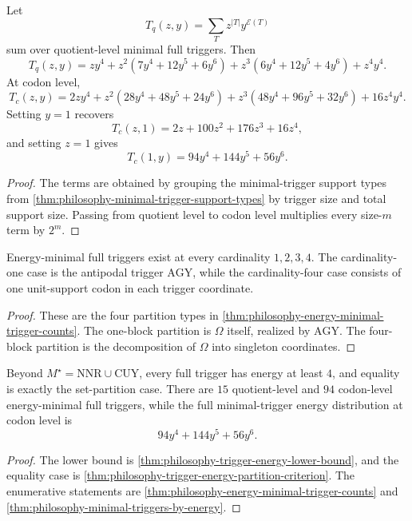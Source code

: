 \begin{theorem}
\label{thm:philosophy-bivariate-minimal-trigger-polynomial}
Let
$$
  T_{q}(z,y)=\sum_{T}z^{|T|}y^{\mathcal{E}(T)}
$$
sum over quotient-level minimal full triggers. Then
$$
  T_{q}(z,y)
  =
  zy^{4}
  +
  z^{2}(7y^{4}+12y^{5}+6y^{6})
  +
  z^{3}(6y^{4}+12y^{5}+4y^{6})
  +
  z^{4}y^{4}.
$$
At codon level,
$$
  T_{c}(z,y)
  =
  2zy^{4}
  +
  z^{2}(28y^{4}+48y^{5}+24y^{6})
  +
  z^{3}(48y^{4}+96y^{5}+32y^{6})
  +
  16z^{4}y^{4}.
$$
Setting $y=1$ recovers
$$
  T_{c}(z,1)=2z+100z^{2}+176z^{3}+16z^{4},
$$
and setting $z=1$ gives
$$
  T_{c}(1,y)=94y^{4}+144y^{5}+56y^{6}.
$$
\end{theorem}
\begin{proof}
The terms are obtained by grouping the minimal-trigger support types
from \autoref{thm:philosophy-minimal-trigger-support-types} by trigger
size and total support size. Passing from quotient level to codon level
multiplies every size-$m$ term by $2^{m}$.
\end{proof}

\begin{corollary}
\label{cor:philosophy-trigger-energy-cardinality}
Energy-minimal full triggers exist at every cardinality
$1,2,3,4$. The cardinality-one case is the antipodal trigger
$\mathrm{AGY}$, while the cardinality-four case consists of one
unit-support codon in each trigger coordinate.
\end{corollary}
\begin{proof}
These are the four partition types in
\autoref{thm:philosophy-energy-minimal-trigger-counts}. The one-block
partition is $\Omega$ itself, realized by $\mathrm{AGY}$. The
four-block partition is the decomposition of $\Omega$ into singleton
coordinates.
\end{proof}

\begin{theorem}
\label{thm:philosophy-trigger-energy-theorem}
Beyond $M^{\star}=\mathrm{NNR}\cup\mathrm{CUY}$, every full trigger has
energy at least $4$, and equality is exactly the set-partition case.
There are $15$ quotient-level and $94$ codon-level energy-minimal full
triggers, while the full minimal-trigger energy distribution at codon
level is
$$
  94y^{4}+144y^{5}+56y^{6}.
$$
\end{theorem}
\begin{proof}
The lower bound is
\autoref{thm:philosophy-trigger-energy-lower-bound}, and the equality
case is \autoref{thm:philosophy-trigger-energy-partition-criterion}.
The enumerative statements are
\autoref{thm:philosophy-energy-minimal-trigger-counts} and
\autoref{thm:philosophy-minimal-triggers-by-energy}.
\end{proof}

